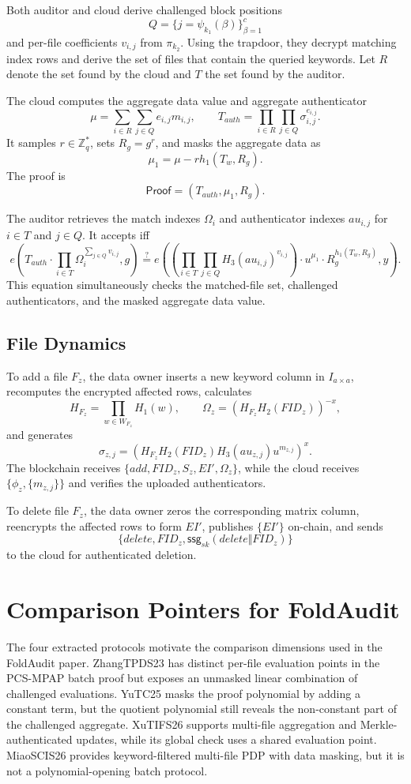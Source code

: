 \documentclass[11pt]{article}
\newcommand{\Zq}{\mathbb{Z}_q}
\begin{document}
Both auditor and cloud derive challenged block positions
\[
    Q=\{j=\psi_{k_1}(\beta)\}_{\beta=1}^{c}
\]
and per-file coefficients \(v_{i,j}\) from \(\pi_{k_2}\).  Using the trapdoor,
they decrypt matching index rows and derive the set of files that contain the
queried keywords.  Let \(R\) denote the set found by the cloud and \(T\) the set
found by the auditor.

The cloud computes the aggregate data value and aggregate authenticator
\[
    \mu=\sum_{i\in R}\sum_{j\in Q} e_{i,j}m_{i,j},
    \qquad
    T_{auth}=\prod_{i\in R}\prod_{j\in Q}\sigma_{i,j}^{e_{i,j}}.
\]
It samples \(r\in\Zq^\ast\), sets \(R_g=g^r\), and masks the aggregate data as
\[
    \mu_1=\mu-rh_1(T_w,R_g).
\]
The proof is
\[
    \mathsf{Proof}=(T_{auth},\mu_1,R_g).
\]

The auditor retrieves the match indexes \(\Omega_i\) and authenticator indexes
\(au_{i,j}\) for \(i\in T\) and \(j\in Q\).  It accepts iff
\[
e\!\left(
    T_{auth}\cdot
    \prod_{i\in T}\Omega_i^{\sum_{j\in Q}v_{i,j}},
    g
\right)
\stackrel{?}{=}
e\!\left(
    \left(\prod_{i\in T}\prod_{j\in Q}H_3(au_{i,j})^{v_{i,j}}\right)
    \cdot u^{\mu_1}\cdot R_g^{h_1(T_w,R_g)},
    y
\right).
\]
This equation simultaneously checks the matched-file set, challenged
authenticators, and the masked aggregate data value.

\subsection{File Dynamics}

To add a file \(F_z\), the data owner inserts a new keyword column in
\(I_{a\times a}\), recomputes the encrypted affected rows, calculates
\[
    H_{F_z}=\prod_{w\in W_{F_z}}H_1(w),\qquad
    \Omega_z=(H_{F_z}H_2(FID_z))^{-x},
\]
and generates
\[
    \sigma_{z,j}=
    \left(H_{F_z}H_2(FID_z)H_3(au_{z,j})u^{m_{z,j}}\right)^x.
\]
The blockchain receives \(\{add,FID_z,S_z,EI',\Omega_z\}\), while the cloud
receives \(\{\phi_z,\{m_{z,j}\}\}\) and verifies the uploaded authenticators.

To delete file \(F_z\), the data owner zeros the corresponding matrix column,
reencrypts the affected rows to form \(EI'\), publishes \(\{EI'\}\) on-chain,
and sends
\[
    \{delete,FID_z,\mathsf{ssg}_{sk}(delete\Vert FID_z)\}
\]
to the cloud for authenticated deletion.

\section{Comparison Pointers for FoldAudit}

The four extracted protocols motivate the comparison dimensions used in the
FoldAudit paper.  ZhangTPDS23 has distinct per-file evaluation
points in the PCS-MPAP batch proof but exposes an unmasked linear combination
of challenged evaluations.  YuTC25 masks the proof polynomial by adding a
constant term, but the quotient polynomial still reveals the non-constant part
of the challenged aggregate.  XuTIFS26 supports multi-file aggregation and
Merkle-authenticated updates, while its global check uses a shared evaluation
point.  MiaoSCIS26 provides keyword-filtered multi-file PDP with data masking,
but it is not a polynomial-opening batch protocol.
\end{document}
